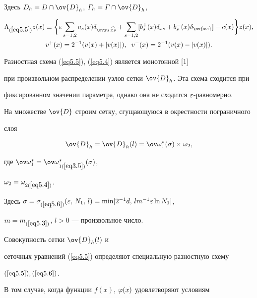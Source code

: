 Здесь $D_h=D\cap \ov{D}_h$, $\varGamma_h=\varGamma\cap\ov{D}_h$,


\begin{gather*}


\Lambda_{(\ref{eq5.5})}z(x)\equiv \bigg\{\eps\sum_{s=1,2}


a_s(x)\dexs+\sum_{s=1,2}


[b_s^{+}(x)\delta_{xs}+b_s^{-}(x)\delta_{\ov{xs}}]-c(x)\bigg\}z(x), \\


v^{+}(x)=2^{-1}(v(x)+|v(x)|),\ \; v^{-}(x)=2^{-1}(v(x)-|v(x)|).


\end{gather*}





Разностная схема (\ref{eq5.5}), (\ref{eq5.4}) является монотонной [1]


при произвольном распределении узлов сетки $\ov{D}_h$. Эта схема сходится при


фиксированном значении параметра, однако она не сходится $\varepsilon$-равномерно.





На множестве $\ov{D}$ строим сетку, сгущающуюся в окрестности пограничного


слоя


\begin{equation}


\label{eq5.6}


\ov{D}_h=\ov{D}_h(l)=\ovo^*_1(\sigma)\times \omega_2,


\end{equation}


где $\ovo_1^*=\ovo^*_{1(\ref{eq3.5})}(\sigma)$,


$\omega_2=\omega_{2(\ref{eq5.4})}$.


Здесь $\sigma=\sigma_{(\ref{eq5.6})}(\eps,\,N_1,\,l)=


\min[2^{-1}d,\, l m^{-1}\eps \ln N_1]$,


$m=m_{(\ref{eq5.3})}$, $l>0$ --- произвольное число.


Совокупность сетки $\ov{D}_h(l)$ и


сеточных уравнений (\ref{eq5.5}) определяют специальную разностную схему


$(\ref{eq5.5}), (\ref{eq5.6})$.





В том случае, когда функции $f(x)$, $\varphi(x)$ удовлетворяют условиям


